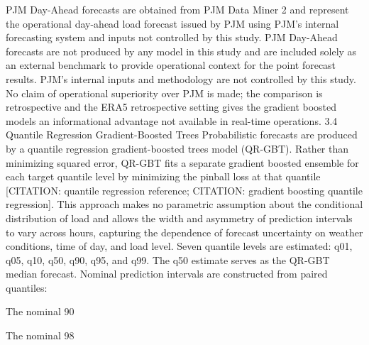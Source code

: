 PJM Day-Ahead forecasts are obtained from PJM Data Miner 2 and represent the operational day-ahead load forecast issued by PJM using PJM's internal forecasting system and inputs not controlled by this study. PJM Day-Ahead forecasts are not produced by any model in this study and are included solely as an external benchmark to provide operational context for the point forecast results. PJM's internal inputs and methodology are not controlled by this study. No claim of operational superiority over PJM is made; the comparison is retrospective and the ERA5 retrospective setting gives the gradient boosted models an informational advantage not available in real-time operations.
3.4 Quantile Regression Gradient-Boosted Trees
Probabilistic forecasts are produced by a quantile regression gradient-boosted trees model (QR-GBT). Rather than minimizing squared error, QR-GBT fits a separate gradient boosted ensemble for each target quantile level by minimizing the pinball loss at that quantile [CITATION: quantile regression reference; CITATION: gradient boosting quantile regression]. This approach makes no parametric assumption about the conditional distribution of load and allows the width and asymmetry of prediction intervals to vary across hours, capturing the dependence of forecast uncertainty on weather conditions, time of day, and load level.
Seven quantile levels are estimated: q01, q05, q10, q50, q90, q95, and q99. The q50 estimate serves as the QR-GBT median forecast. Nominal prediction intervals are constructed from paired quantiles:


The nominal 90%


The nominal 98%


